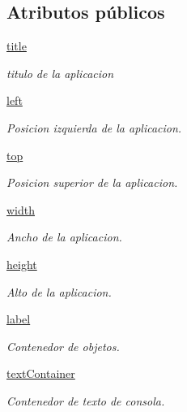 \subsection*{Atributos públicos}
\begin{DoxyCompactItemize}
\item 
\mbox{\hyperlink{classfacepi_1_1_face_pi_afccfe61a4761c5a45b4fbc820a5240df}{title}}
\begin{DoxyCompactList}\small\item\em titulo de la aplicacion \end{DoxyCompactList}\item 
\mbox{\hyperlink{classfacepi_1_1_face_pi_a5a300c103ace38df66904b7be129fab4}{left}}
\begin{DoxyCompactList}\small\item\em Posicion izquierda de la aplicacion. \end{DoxyCompactList}\item 
\mbox{\hyperlink{classfacepi_1_1_face_pi_a187a0c2fb08f32d311610ba565e7887e}{top}}
\begin{DoxyCompactList}\small\item\em Posicion superior de la aplicacion. \end{DoxyCompactList}\item 
\mbox{\hyperlink{classfacepi_1_1_face_pi_a57e3ba2b24e564c5293372fd32408411}{width}}
\begin{DoxyCompactList}\small\item\em Ancho de la aplicacion. \end{DoxyCompactList}\item 
\mbox{\hyperlink{classfacepi_1_1_face_pi_a139e27fbb3d9131c28b1c0a18d0e5e82}{height}}
\begin{DoxyCompactList}\small\item\em Alto de la aplicacion. \end{DoxyCompactList}\item 
\mbox{\hyperlink{classfacepi_1_1_face_pi_a908848418be9c22c357748a0b3550869}{label}}
\begin{DoxyCompactList}\small\item\em Contenedor de objetos. \end{DoxyCompactList}\item 
\mbox{\hyperlink{classfacepi_1_1_face_pi_a10efba4963818e4ce358e3cc3580e223}{text\+Container}}
\begin{DoxyCompactList}\small\item\em Contenedor de texto de consola. \end{DoxyCompactList}\item 

\end{DoxyCompactItemize}
